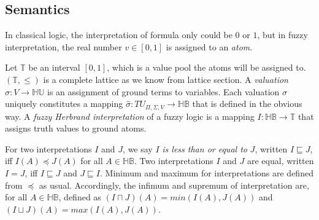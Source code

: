 \subsection{Semantics}
\label{sec:FLSemantics}
In classical logic, the interpretation of formula only could be $0$ or $1$, but in fuzzy interpretation, the real number $v \in [0,1]$ is assigned to an \textit{atom}.

Let $\mathbb{T}$ be an interval $[0,1]$, which is a value pool the atoms will be assigned to. 
$(\mathbb{T},\leq)$ is a complete lattice as we know from lattice section.
A \textit{valuation} $\sigma : V \rightarrow \mathbb{HU}$ is an assignment of ground terms to variables. Each valuation $\sigma$ uniquely constitutes a mapping 
$\hat{\sigma} : TU_{\Pi,\Sigma,V} \rightarrow \mathbb{HB}$ that is defined in the obvious way.
A \textit{fuzzy Herbrand interpretation} of a fuzzy logic is a mapping 
$I: \mathbb{HB} \rightarrow \mathbb{T}$ that assigns truth values to ground atoms.

For two interpretations $I$ and $J$, we say $I$ \textit{is less than or equal to} $J$, written $I \sqsubseteq J$, iff $I(A) \preceq J(A)$ for all $A \in \mathbb{HB}$. Two interpretations $I$ and $J$ are equal, written $I = J$, iff $I \sqsubseteq J$ and $J \sqsubseteq I$. Minimum and maximum for interpretations are defined from $\preceq$ as usual.
Accordingly, the infimum and supremum of interpretation are, for all $A \in \mathbb{HB}$, defined as $(I \sqcap J)(A) = min(I(A),J(A))$ and $(I \sqcup J)(A) = max(I(A),J(A))$.